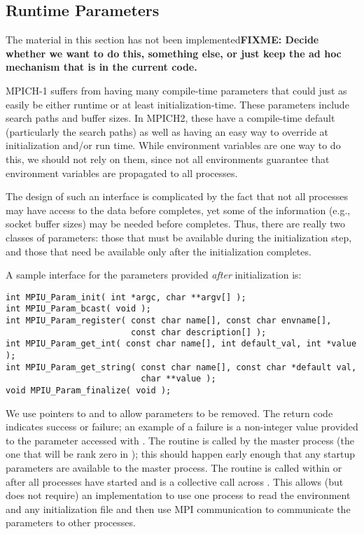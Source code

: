 \documentclass{article}
\def\fixme#1{\marginpar{FIXME:}\textbf{FIXME: #1}}
\begin{document}
\subsection{Runtime Parameters}
\label{sec:runtime-params}
The material in this section has not been implemented\fixme{Decide
  whether we want to do this, something else, or just keep the ad hoc
  mechanism that is in the current code.}


MPICH-1 suffers from having many compile-time parameters that could just as
easily be either runtime or at least initialization-time.  These parameters
include search paths and buffer sizes.  In MPICH2, these have a compile-time
default (particularly the search paths) as well as having an easy way
to override at 
initialization and/or run time.  While environment variables are one way to do
this, we should not rely on them, since not all environments guarantee that
environment variables are propagated to all processes.

The design of such an interface is complicated by the fact that not
all processes may have access to the data before 
completes, yet some of the information (e.g., socket buffer sizes) may
be needed before  completes.  Thus, there are really
two classes of parameters: those that must be available during the
initialization step, and those that need be available only after the
initialization completes.  

A sample interface for the parameters provided \emph{after}
initialization is:%
%
\begin{verbatim}
int MPIU_Param_init( int *argc, char **argv[] );
int MPIU_Param_bcast( void );
int MPIU_Param_register( const char name[], const char envname[], 
                         const char description[] );
int MPIU_Param_get_int( const char name[], int default_val, int *value );
int MPIU_Param_get_string( const char name[], const char *default val,
                           char **value );
void MPIU_Param_finalize( void );
\end{verbatim}
We use pointers to  and  to allow parameters to be
removed.  The return code indicates success or failure; an example of a
failure is a non-integer value provided to the parameter accessed with
. 
The routine  is called by the master process (the one
that will be rank zero in ); this should happen early
enough that any startup parameters are available to the master process.  The
routine  is called within  or
 after all processes have started and is a collective
call across .  This allows (but does not require)
an implementation to use one 
process to read the environment and any initialization file and then use MPI
communication to communicate the parameters to other processes.  
\end{document}
